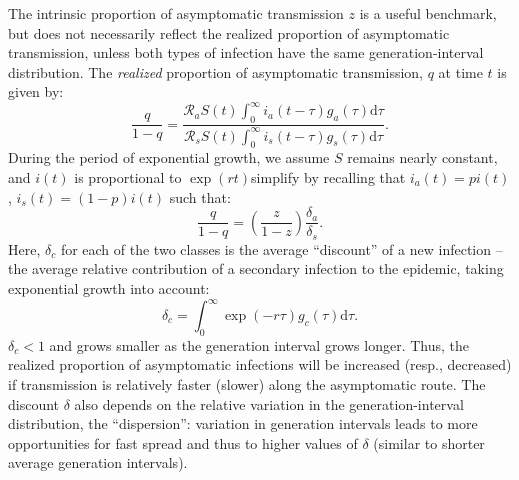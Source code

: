 The intrinsic proportion of asymptomatic transmission $z$ is a useful benchmark, but does not necessarily reflect the realized proportion of asymptomatic transmission, unless both types of infection have the same generation-interval distribution.
The \emph{realized} proportion of asymptomatic transmission, $q$ at time $t$ is given by:
\begin{equation}
\frac{q}{1-q}=\frac{\mathcal R_a S(t) \int_0^\infty i_a(t-\tau) g_a(\tau) \mathrm{d}\tau}{\mathcal R_s S(t) \int_0^\infty i_s(t-\tau) g_s(\tau) \mathrm{d}\tau}.
\end{equation}
During the period of exponential growth, we assume $S$ remains nearly constant, and $i(t)$ is proportional to $\exp(r t)$\DIFdelbegin {}\DIFdelend \DIFaddbegin {}\DIFaddend simplify by recalling that $i_a(t)= p i(t)$, $i_s(t)=(1-p)i(t)$ such that: 
\begin{equation}
\frac{q}{1-q}=\left(\frac{z}{1-z}\right)\frac{\delta_a}{\delta_s}.
\label{eq.qratio}
\end{equation}
Here, $\delta_c$ for each of the two classes is the average ``discount'' of a new infection -- the average relative contribution of a secondary infection to the epidemic, taking exponential growth into account:
\begin{equation}
	\delta_c = \int_0^\infty \exp(-r\tau) g_c(\tau) \mathrm{d}\tau.
\end{equation}
$\delta_c<1$ and grows smaller as the generation interval grows longer.
Thus, the realized proportion of asymptomatic infections will be increased (resp., decreased) if transmission is relatively faster (slower) along the asymptomatic route.
The discount $\delta$ also depends on the relative variation in the generation-interval distribution, the ``dispersion'': \DIFdelbegin {}\DIFdelend \DIFaddbegin {}\DIFaddend variation in generation intervals leads to more opportunities for fast spread and thus to higher values of $\delta$ (similar to shorter average generation intervals). 

